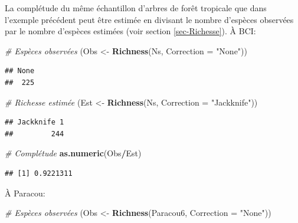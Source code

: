 \documentclass[
  11pt,
  french,
  a4paper,
  extrafontsizes,onecolumn,openright
  ]{memoir}
\newenvironment{Shaded}{\begin{snugshade}}{\end{snugshade}}
\newcommand{\CommentTok}[1]{\textcolor[rgb]{0.56,0.35,0.01}{\textit{#1}}}
\newcommand{\DataTypeTok}[1]{\textcolor[rgb]{0.13,0.29,0.53}{#1}}
\newcommand{\KeywordTok}[1]{\textcolor[rgb]{0.13,0.29,0.53}{\textbf{#1}}}
\newcommand{\NormalTok}[1]{#1}
\newcommand{\OperatorTok}[1]{\textcolor[rgb]{0.81,0.36,0.00}{\textbf{#1}}}
\newcommand{\StringTok}[1]{\textcolor[rgb]{0.31,0.60,0.02}{#1}}
\begin{document}
La complétude du même échantillon d'arbres de forêt tropicale que dans l'exemple précédent peut être estimée en divisant le nombre d'espèces observées par le nombre d'espèces estimées (voir section \ref{sec-Richesse}).
À BCI:

\scriptsize

\begin{Shaded}
\begin{Highlighting}[]
\CommentTok{# Espèces observées}
\NormalTok{(Obs <-}\StringTok{ }\KeywordTok{Richness}\NormalTok{(Ns, }\DataTypeTok{Correction =} \StringTok{"None"}\NormalTok{))}
\end{Highlighting}
\end{Shaded}

\begin{verbatim}
## None 
##  225
\end{verbatim}

\begin{Shaded}
\begin{Highlighting}[]
\CommentTok{# Richesse estimée}
\NormalTok{(Est <-}\StringTok{ }\KeywordTok{Richness}\NormalTok{(Ns, }\DataTypeTok{Correction =} \StringTok{"Jackknife"}\NormalTok{))}
\end{Highlighting}
\end{Shaded}

\begin{verbatim}
## Jackknife 1 
##         244
\end{verbatim}

\begin{Shaded}
\begin{Highlighting}[]
\CommentTok{# Complétude}
\KeywordTok{as.numeric}\NormalTok{(Obs}\OperatorTok{/}\NormalTok{Est)}
\end{Highlighting}
\end{Shaded}

\begin{verbatim}
## [1] 0.9221311
\end{verbatim}

\normalsize

À Paracou:

\scriptsize

\begin{Shaded}
\begin{Highlighting}[]
\CommentTok{# Espèces observées}
\NormalTok{(Obs <-}\StringTok{ }\KeywordTok{Richness}\NormalTok{(Paracou6, }\DataTypeTok{Correction =} \StringTok{"None"}\NormalTok{))}
\end{Highlighting}
\end{Shaded}
\end{document}
